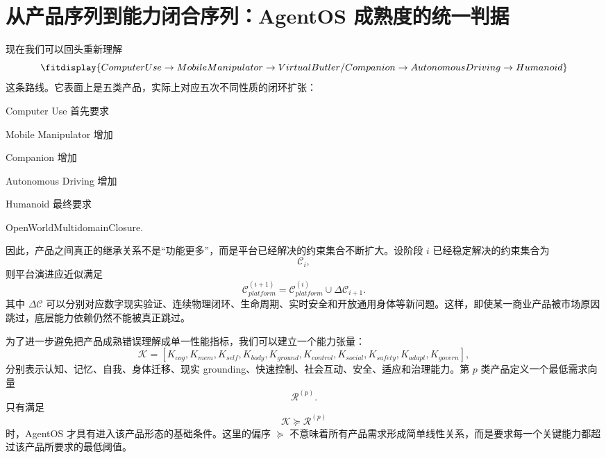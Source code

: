 \section{从产品序列到能力闭合序列：AgentOS 成熟度的统一判据}

现在我们可以回头重新理解
\[
\fitdisplay{
ComputerUse
\rightarrow
MobileManipulator
\rightarrow
VirtualButler/Companion
\rightarrow
AutonomousDriving
\rightarrow
Humanoid
}
\]
这条路线。它表面上是五类产品，实际上对应五次不同性质的闭环扩张：

Computer Use 首先要求
\begin{statementbox}
\centering
{}
\end{statementbox}
Mobile Manipulator 增加
\begin{statementbox}
\centering
{}
\end{statementbox}
Companion 增加
\begin{statementbox}
\centering
{}
\end{statementbox}
Autonomous Driving 增加
\begin{statementbox}
\centering
{}
\end{statementbox}
Humanoid 最终要求
\begin{statementbox}
OpenWorldMultidomainClosure.
\end{statementbox}

因此，产品之间真正的继承关系不是“功能更多”，而是平台已经解决的约束集合不断扩大。设阶段 $i$ 已经稳定解决的约束集合为
\[
\mathcal{C}_i,
\]
则平台演进应近似满足
\[
\mathcal{C}_{platform}^{(i+1)}
=
\mathcal{C}_{platform}^{(i)}
\cup
\Delta\mathcal{C}_{i+1}.
\]
其中 $\Delta\mathcal{C}$ 可以分别对应数字现实验证、连续物理闭环、生命周期、实时安全和开放通用身体等新问题。这样，即使某一商业产品被市场原因跳过，底层能力依赖仍然不能被真正跳过。

为了进一步避免把产品成熟错误理解成单一性能指标，我们可以建立一个能力张量：
\[
\mathcal{K}
=
\left[
K_{cog},
K_{mem},
K_{self},
K_{body},
K_{ground},
K_{control},
K_{social},
K_{safety},
K_{adapt},
K_{govern}
\right],
\]
分别表示认知、记忆、自我、身体迁移、现实 grounding、快速控制、社会互动、安全、适应和治理能力。第 $p$ 类产品定义一个最低需求向量
\[
\mathcal{R}^{(p)}.
\]
只有满足
\[
\mathcal{K}
\succeq
\mathcal{R}^{(p)}
\]
时，AgentOS 才具有进入该产品形态的基础条件。这里的偏序 $\succeq$ 不意味着所有产品需求形成简单线性关系，而是要求每一个关键能力都超过该产品所要求的最低阈值。

